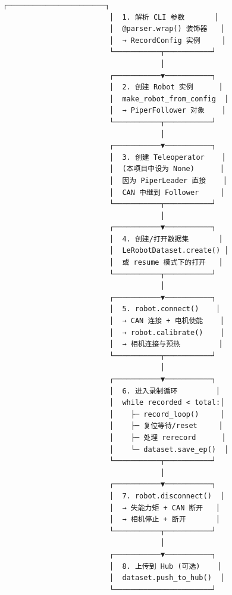 \documentclass[UTF8,a4paper,11pt]{ctexart}
\begin{document}
{\begin{lstlisting}[language=text]
                         ┌───────────────────────┐
                         │  1. 解析 CLI 参数       │
                         │  @parser.wrap() 装饰器   │
                         │  → RecordConfig 实例     │
                         └───────────┬───────────┘
                                     │
                         ┌───────────▼───────────┐
                         │  2. 创建 Robot 实例      │
                         │  make_robot_from_config  │
                         │  → PiperFollower 对象    │
                         └───────────┬───────────┘
                                     │
                         ┌───────────▼───────────┐
                         │  3. 创建 Teleoperator    │
                         │  (本项目中设为 None)      │
                         │  因为 PiperLeader 直接    │
                         │  CAN 中继到 Follower     │
                         └───────────┬───────────┘
                                     │
                         ┌───────────▼───────────┐
                         │  4. 创建/打开数据集       │
                         │  LeRobotDataset.create() │
                         │  或 resume 模式下的打开   │
                         └───────────┬───────────┘
                                     │
                         ┌───────────▼───────────┐
                         │  5. robot.connect()    │
                         │  → CAN 连接 + 电机使能    │
                         │  → robot.calibrate()    │
                         │  → 相机连接与预热         │
                         └───────────┬───────────┘
                                     │
                         ┌───────────▼───────────┐
                         │  6. 进入录制循环         │
                         │  while recorded < total:│
                         │    ├─ record_loop()     │
                         │    ├─ 复位等待/reset     │
                         │    ├─ 处理 rerecord      │
                         │    └─ dataset.save_ep()  │
                         └───────────┬───────────┘
                                     │
                         ┌───────────▼───────────┐
                         │  7. robot.disconnect()  │
                         │  → 失能力矩 + CAN 断开   │
                         │  → 相机停止 + 断开       │
                         └───────────┬───────────┘
                                     │
                         ┌───────────▼───────────┐
                         │  8. 上传到 Hub (可选)    │
                         │  dataset.push_to_hub()  │
                         └───────────────────────┘
\end{lstlisting}

}
\end{document}
